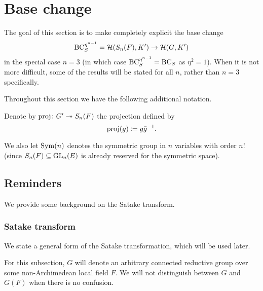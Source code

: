 \section{Base change}
\label{sec:satake}

The goal of this section is to make completely explicit the base change
\[ \operatorname{BC}_{S}^{\eta^{n-1}} = \mathcal H(S_n(F), K') \to \mathcal H(G, K') \]
in the special case $n = 3$
(in which case $\operatorname{BC}_S^{\eta^{n-1}} = \operatorname{BC}_S$ as $\eta^2 = 1$).
When it is not more difficult, some of the results will be stated for all $n$,
rather than $n = 3$ specifically.

Throughout this section we have the following additional notation.
\begin{definition}
  Denote by $\operatorname{proj} \colon G' \twoheadrightarrow S_n(F)$ the projection defined by
  \[ \operatorname{proj}(g) \coloneqq g \bar{g}^{-1}. \]
\end{definition}
We also let $\operatorname{Sym}(n)$ denotes the symmetric group in $n$ variables with order $n!$
(since $S_n(F) \subseteq \operatorname{GL}_n(E)$ is already reserved for the symmetric space).

\subsection{Reminders}
We provide some background on the Satake transform.

\subsubsection{Satake transform}
We state a general form of the Satake transformation, which will be used later.

For this subsection, $G$ will denote an arbitrary connected reductive group
over some non-Archimedean local field $F$.
We will not distinguish between $G$ and $G(F)$ when there is no confusion.


